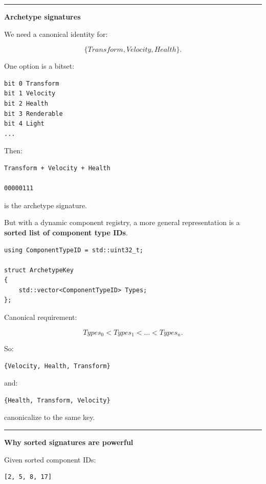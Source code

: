 \begin{center}\rule{0.5\linewidth}{0.5pt}\end{center}

\textbf{Archetype signatures}

We need a canonical identity for:

\[
\{Transform,Velocity,Health\}.
\]

One option is a bitset:

\begin{verbatim}
bit 0 Transform
bit 1 Velocity
bit 2 Health
bit 3 Renderable
bit 4 Light
...
\end{verbatim}

Then:

\begin{verbatim}
Transform + Velocity + Health

00000111
\end{verbatim}

is the archetype signature.

But with a dynamic component registry, a more general representation is a \textbf{sorted list of component type IDs}.

\begin{verbatim}
using ComponentTypeID = std::uint32_t;

struct ArchetypeKey
{
    std::vector<ComponentTypeID> Types;
};
\end{verbatim}

Canonical requirement:

\[
Types_0<Types_1<\dots<Types_n.
\]

So:

\begin{verbatim}
{Velocity, Health, Transform}
\end{verbatim}

and:

\begin{verbatim}
{Health, Transform, Velocity}
\end{verbatim}

canonicalize to the same key.

\begin{center}\rule{0.5\linewidth}{0.5pt}\end{center}

\textbf{Why sorted signatures are powerful}

Given sorted component IDs:

\begin{verbatim}
[2, 5, 8, 17]
\end{verbatim}

